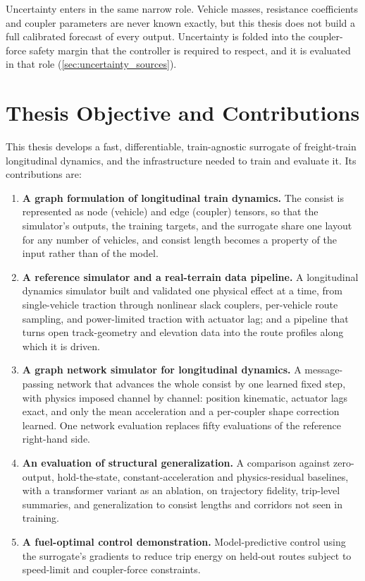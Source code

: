Uncertainty enters in the same narrow role. Vehicle masses, resistance coefficients and coupler parameters are never known exactly, but this thesis does not build a full calibrated forecast of every output. Uncertainty is folded into the coupler-force safety margin that the controller is required to respect, and it is evaluated in that role (\cref{sec:uncertainty_sources}).

\section{Thesis Objective and Contributions}

This thesis develops a fast, differentiable, train-agnostic surrogate of freight-train longitudinal dynamics, and the infrastructure needed to train and evaluate it. Its contributions are:

\begin{enumerate}
    \item \textbf{A graph formulation of longitudinal train dynamics.} The consist is represented as node (vehicle) and edge (coupler) tensors, so that the simulator's outputs, the training targets, and the surrogate share one layout for any number of vehicles, and consist length becomes a property of the input rather than of the model.
    \item \textbf{A reference simulator and a real-terrain data pipeline.} A longitudinal dynamics simulator built and validated one physical effect at a time, from single-vehicle traction through nonlinear slack couplers, per-vehicle route sampling, and power-limited traction with actuator lag; and a pipeline that turns open track-geometry and elevation data into the route profiles along which it is driven.
    \item \textbf{A graph network simulator for longitudinal dynamics.} A message-passing network that advances the whole consist by one learned fixed step, with physics imposed channel by channel: position kinematic, actuator lags exact, and only the mean acceleration and a per-coupler shape correction learned. One network evaluation replaces fifty evaluations of the reference right-hand side.
    \item \textbf{An evaluation of structural generalization.} A comparison against zero-output, hold-the-state, constant-acceleration and physics-residual baselines, with a transformer variant as an ablation, on trajectory fidelity, trip-level summaries, and generalization to consist lengths and corridors not seen in training.
    \item \textbf{A fuel-optimal control demonstration.} Model-predictive control using the surrogate's gradients to reduce trip energy on held-out routes subject to speed-limit and coupler-force constraints.
\end{enumerate}

